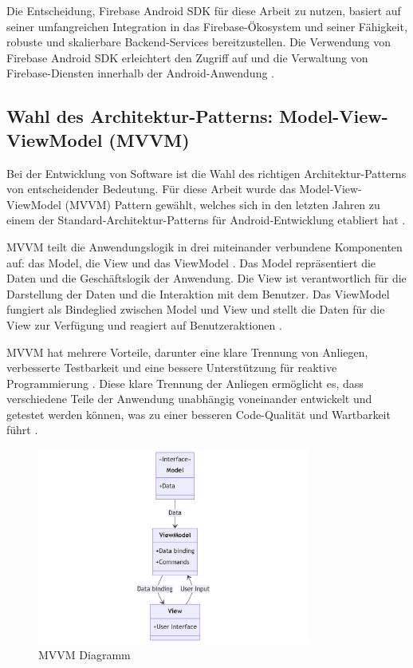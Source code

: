 \noindent
Die Entscheidung, Firebase Android SDK für diese Arbeit zu nutzen, basiert auf seiner umfangreichen Integration in das Firebase-Ökosystem und seiner Fähigkeit, robuste und skalierbare Backend-Services bereitzustellen. Die Verwendung von Firebase Android SDK erleichtert den Zugriff auf und die Verwaltung von Firebase-Diensten innerhalb der Android-Anwendung \cite{FirebaseSDK2022}.

\subsection{Wahl des Architektur-Patterns: Model-View-ViewModel (\ac*{MVVM})} \label{Wahl des Architektur-Pattern}
Bei der Entwicklung von Software ist die Wahl des richtigen Architektur-Patterns von entscheidender Bedeutung. Für diese Arbeit wurde das Model-View-ViewModel (MVVM) Pattern gewählt, welches sich in den letzten Jahren zu einem der Standard-Architektur-Patterns für Android-Entwicklung etabliert hat \cite{AndroidAppArchitecture}. \newline

\noindent
MVVM teilt die Anwendungslogik in drei miteinander verbundene Komponenten auf: das Model, die View und das ViewModel \cite{MicrosoftMVVM2022}. Das Model repräsentiert die Daten und die Geschäftslogik der Anwendung. Die View ist verantwortlich für die Darstellung der Daten und die Interaktion mit dem Benutzer. Das ViewModel fungiert als Bindeglied zwischen Model und View und stellt die Daten für die View zur Verfügung und reagiert auf Benutzeraktionen \cite{AndroidAppArchitecture}. \newline

\noindent
MVVM hat mehrere Vorteile, darunter eine klare Trennung von Anliegen, verbesserte Testbarkeit und eine bessere Unterstützung für reaktive Programmierung \cite{AndroidAppArchitecture}. Diese klare Trennung der Anliegen ermöglicht es, dass verschiedene Teile der Anwendung unabhängig voneinander entwickelt und getestet werden können, was zu einer besseren Code-Qualität und Wartbarkeit führt \cite{MicrosoftMVVM2022}. \newline
\begin{figure}[h]
    \centering
    \includegraphics[width=0.8\textwidth]{images/diagramme/MVVM.png}
    \caption{MVVM Diagramm}
    \label{fig:mvvm}
\end{figure}
    
